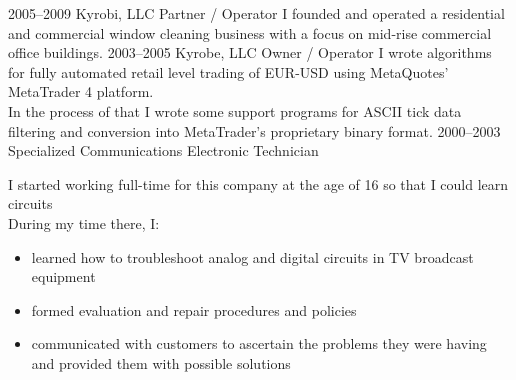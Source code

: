 \begin{entrylist}
{\begin{itemize}
            \end{itemize}
        }
    \entry
        {2005--2009}
        {Kyrobi, LLC}
        {Partner / Operator}
        {
            I founded and operated a residential and commercial window cleaning business with a focus on mid-rise commercial
            office buildings.
        }
    \entry
        {2003--2005}
        {Kyrobe, LLC}
        {Owner / Operator}
        {
            I wrote algorithms for fully automated retail level trading of EUR-USD using MetaQuotes' MetaTrader 4 platform.\\
            In the process of that I wrote some support programs for ASCII tick data filtering and conversion into MetaTrader's proprietary binary format.
        }
    \entry
        {2000--2003}
        {Specialized Communications}
        {Electronic Technician}
        {
            I started working full-time for this company at the age of 16 so that I could learn circuits\\
            During my time there, I:
            \begin{itemize}
                \item learned how to troubleshoot analog and digital circuits in TV broadcast equipment
                \item formed evaluation and repair procedures and policies
                \item communicated with customers to ascertain the problems they were having and
                      provided them with possible solutions
            \end{itemize}
        }
\end{entrylist}
